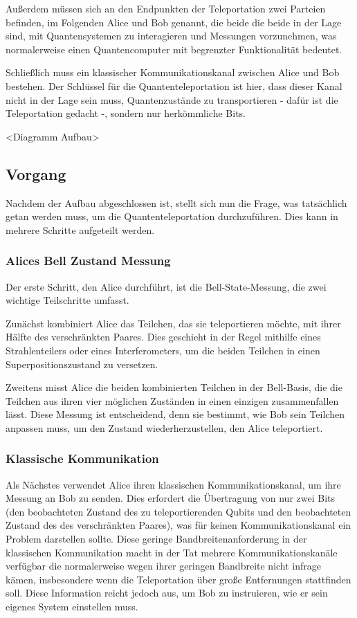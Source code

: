 Außerdem müssen sich an den Endpunkten der Teleportation zwei Parteien befinden, im Folgenden Alice und Bob genannt, die beide
die beide in der Lage sind, mit Quantensystemen zu interagieren und Messungen vorzunehmen, was normalerweise einen Quantencomputer mit begrenzter Funktionalität bedeutet.

Schließlich muss ein klassischer Kommunikationskanal zwischen Alice und Bob bestehen.
Der Schlüssel für die Quantenteleportation ist hier, dass dieser Kanal nicht in der Lage sein muss, Quantenzustände zu transportieren - dafür ist die Teleportation gedacht -, sondern nur herkömmliche Bits.

<Diagramm Aufbau>

\subsection{Vorgang}\label{subsec:process}

Nachdem der Aufbau abgeschlossen ist, stellt sich nun die Frage, was tatsächlich getan werden muss, um die Quantenteleportation durchzuführen.
Dies kann in mehrere Schritte aufgeteilt werden.

\subsubsection{Alices Bell Zustand Messung}
Der erste Schritt, den Alice durchführt, ist die Bell-State-Messung, die zwei wichtige Teilschritte umfasst.

Zunächst kombiniert Alice das Teilchen, das sie teleportieren möchte, mit ihrer Hälfte des verschränkten Paares.
Dies geschieht in der Regel mithilfe eines Strahlenteilers oder eines Interferometers, um die beiden Teilchen in einen Superpositionszustand zu versetzen.

Zweitens misst Alice die beiden kombinierten Teilchen in der Bell-Basis, die die Teilchen aus ihren vier möglichen Zuständen in einen einzigen zusammenfallen lässt.
Diese Messung ist entscheidend, denn sie bestimmt, wie Bob sein Teilchen anpassen muss, um den Zustand wiederherzustellen, den
Alice teleportiert.
\subsubsection{Klassische Kommunikation}
Als Nächstes verwendet Alice ihren klassischen Kommunikationskanal, um ihre Messung an Bob zu senden.
Dies erfordert die Übertragung von nur zwei Bits (den beobachteten Zustand des zu teleportierenden Qubits und den beobachteten Zustand des
des verschränkten Paares), was für keinen Kommunikationskanal ein Problem darstellen sollte.
Diese geringe Bandbreitenanforderung in der klassischen Kommunikation macht in der Tat mehrere Kommunikationskanäle verfügbar
die normalerweise wegen ihrer geringen Bandbreite nicht infrage kämen, insbesondere wenn die Teleportation über große
Entfernungen stattfinden soll.
Diese Information reicht jedoch aus, um Bob zu instruieren, wie er sein eigenes System einstellen muss.

